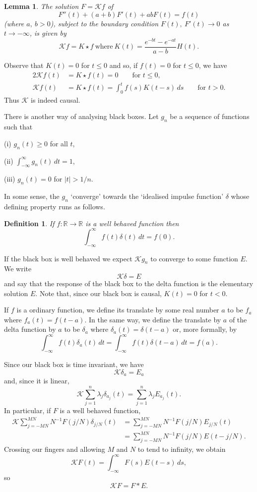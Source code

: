 \documentclass[12pt]{article}
\newtheorem{lemma}[theorem]{Lemma}
\newtheorem{definition}[theorem]{Definition}
\theoremstyle{definition}
\begin{document}
\begin{lemma}\label{Lemma, big star}
The solution $F={\mathcal K}f$ of
\begin{equation*}
\tag*{$\bigstar$}
F''(t)+(a+b)F'(t)+ab F(t)=f(t)
\end{equation*}
(where $a,\ b>0$), subject to the boundary condition
$F(t),\ F'(t)\rightarrow 0$ as $t\rightarrow -\infty$,
is given by
\[{\mathcal K}f=K\star f
\ \text{where}\ K(t)=\frac{e^{-bt}-e^{-at}}{a-b}H(t).\]
\end{lemma}

Observe that $K(t)=0$ for $t\leq 0$ and so, if $f(t)=0$
for $t\leq 0$, we have
\begin{alignat*}{2}
{\mathcal K}f(t)&=K\star f(t)=0\qquad\text{for $t\leq 0$},\\
{\mathcal K}f(t)&=K\star f(t)=\int_{0}^{t}f(s)K(t-s)\,ds
\qquad\text{for $t>0$}.
\end{alignat*}
Thus ${\mathcal K}$ is indeed causal.

There is another way of analysing black boxes. Let
$g_{n}$ be a sequence of functions such that

(i) $g_{n}(t)\geq 0$ for all $t$,

(ii) ${\displaystyle \int_{-\infty}^{\infty}g_{n}(t)\,dt=1}$,

(iii) $g_{n}(t)=0$ for $|t|>1/n$.

\noindent In some sense, the $g_{n}$ `converge' towards
the `idealised impulse function' $\delta$ whose
defining property runs as follows.
\begin{definition} If $f:{\mathbb R}\rightarrow{\mathbb R}$
is a well behaved function then
\[\int_{-\infty}^{\infty}f(t)\delta(t)\,dt=f(0).\]
\end{definition}
If the black box is well behaved we expect ${\mathcal K}g_{n}$
to converge to some function $E$. We write
\[{\mathcal K}\delta=E\]
and say that the response of the black box to the delta
function is the elementary solution $E$. Note that,
since our black box is causal, $K(t)=0$ for $t<0$.

If $f$ is a ordinary function, we define its translate
by some real number $a$ to be $f_{a}$ where
$f_{a}(t)=f(t-a)$. In the same way, we define the
translate by $a$ of the delta function by $a$ to be
$\delta_{a}$ where $\delta_{a}(t)=\delta(t-a)$ or,
more formally, by
\[\int_{-\infty}^{\infty}f(t)\delta_{a}(t)\,dt=
\int_{-\infty}^{\infty}f(t)\delta(t-a)\,dt=f(a).\]

Since our black box is time invariant, we have
\[{\mathcal K}\delta_{a}=E_{a}\]
and, since it is linear,
\[{\mathcal K}\sum_{j=1}^{n}\lambda_{j}\delta_{a_{j}}(t)=
\sum_{j=1}^{n}\lambda_{j}E_{a_{j}}(t).\]
In particular, if $F$ is a well behaved function,
\begin{align*}
{\mathcal K}\sum_{j=-MN}^{MN}N^{-1}F(j/N)\delta_{j/N}(t)&=
\sum_{j=-MN}^{MN}N^{-1}F(j/N)E_{j/N}(t)\\
&=\sum_{j=-MN}^{MN}N^{-1}F(j/N)E(t-j/N).
\end{align*}
Crossing our fingers and allowing $M$ and $N$ to tend
to infinity, we obtain
\[{\mathcal K}F(t)=\int_{-\infty}^{\infty}F(s)E(t-s)\,ds,\]
so
\[{\mathcal K}F=F*E.\]
\end{document}

